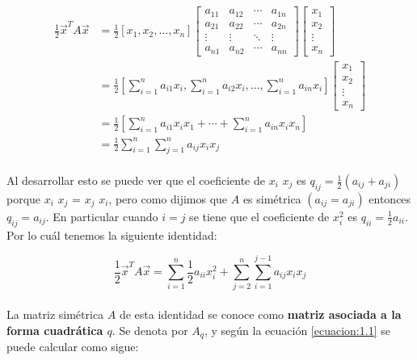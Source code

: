\begin{align*}
\frac{1}{2} \overrightarrow{x}^{T} A \overrightarrow{x} &= \frac{1}{2}[x_{1}, x_{2},\ldots,x_{n}] 
\begin{bmatrix}
a_{11} & a_{12} & \cdots & a_{1n}\\
a_{21} & a_{22} & \cdots & a_{2n}\\
\vdots & \vdots & \ddots & \vdots \\
a_{n1} & a_{n2} & \cdots & a_{nn}
\end{bmatrix} 
\begin{bmatrix}
x_{1}\\
x_{2}\\
\vdots\\
x_{n}
\end{bmatrix} \\ 
&= \frac{1}{2} \left[\sum_{i=1}^{n} a_{i1}x_{i}, \sum_{i=1}^{n} a_{i2}x_{i}, \ldots , \sum_{i=1}^{n} a_{in}x_{i} \right] 
\begin{bmatrix}
x_{1}\\
x_{2}\\
\vdots\\
x_{n}
\end{bmatrix} \\ 
&=   \frac{1}{2} \left[\sum_{i=1}^{n} a_{i1}x_{i}x_{1} + \cdots + \sum_{i=1}^{n} a_{in}x_{i}x_{n}\right]\\ 
&=   \frac{1}{2} \sum_{i=1}^{n}\sum_{j=1}^{n} a_{ij}x_{i}x_{j}
\end{align*}

\paragraph*{}
Al desarrollar esto se puede ver que el coeficiente de $x_{i}$ $x_{j}$ es $q_{ij} = \frac{1}{2} \left(a_{ij} + a_{ji} \right)$ porque $x_{i}$ $x_{j}$ = $x_{j}$ $x_{i}$, pero como dijimos que $A$ es simétrica $\left( a_{ij} = a_{ji}\right)$ entonces $q_{ij} = a_{ij}$. En particular cuando $i = j$ se tiene que el coeficiente de $x_{i}^{2}$ es $q_{ii} = \frac{1}{2}a_{ii}$. Por lo cuál tenemos la siguiente identidad:

\begin{equation}
    \frac{1}{2} \overrightarrow{x}^{T} A \overrightarrow{x} = \sum_{i=1}^{n}\frac{1}{2} a_{ii}x_{i}^{2} + \sum_{j=2}^{n}\sum_{i=1}^{j-1} a_{ij}x_{i}x_{j}
    \label{ecuacion:1.1}
\end{equation}

\paragraph*{}
La matriz simétrica $A$ de esta identidad se conoce como \textbf{matriz asociada a la forma cuadrática $q$}. Se denota por \textbf{$A_{q}$}, y según la ecuación  \ref{ecuacion:1.1} se puede calcular como sigue:

